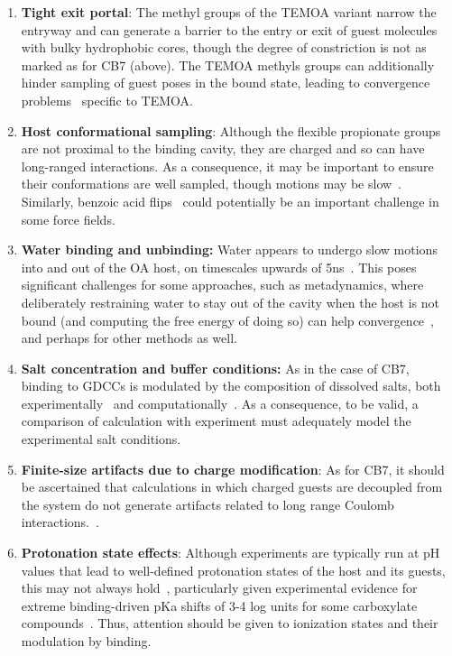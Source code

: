 \documentclass[aps,pre,twocolumn,nofootinbib,superscriptaddress,10pt, final,tightenlines]{revtex4-1}
\begin{document}
\begin{enumerate}
\item{{\bf Tight exit portal}: The methyl groups of the TEMOA variant narrow the entryway and can generate a barrier to the entry or exit of guest molecules with bulky hydrophobic cores, though the degree of constriction is not as marked as for CB7 (above). 
The TEMOA methyls groups can additionally hinder sampling of guest poses in the bound state, leading to convergence problems~\cite{yin_sampl5_preprint} specific to TEMOA. }

\item{{\bf Host conformational sampling}: Although the flexible propionate groups are not proximal to the binding cavity, they are charged and so can have long-ranged interactions. 
As a consequence, it may be important to ensure their conformations are well sampled, though motions may be slow~\cite{mikulskis_free-energy_2014}. 
Similarly, benzoic acid flips~\cite{yin_sampl5_2016, tofoleanu_absolute_2016} could potentially be an important challenge in some force fields.}

\item{{\bf Water binding and unbinding:} Water appears to undergo slow motions into and out of the OA host, on timescales upwards of 5ns~\cite{ewell_water_2008}. 
This poses significant challenges for some approaches, such as metadynamics, where deliberately restraining water to stay out of the cavity when the host is not bound (and computing the free energy of doing so) can help convergence~\cite{bhakat_resolving_2016}, and perhaps for other methods as well.}

\item{{\bf Salt concentration and buffer conditions:} As in the case of CB7, binding to GDCCs is modulated by the composition of dissolved salts, both experimentally~\cite{gibb_anion_2011, sokkalingam_binding_2016} and computationally~\cite{pal_combined_2016, tofoleanu_absolute_2016}. As a consequence, to be valid, a comparison of calculation with experiment must adequately model the experimental salt conditions.
}

\item{{\bf Finite-size artifacts due to charge modification}: As for CB7, it should be ascertained that calculations in which charged guests are decoupled from the system do not generate artifacts related to long range Coulomb interactions.~\cite{rocklin_calculating_2013, lin_overview_2014, reif_net_2014, simonson_concepts_2016}.}

\item{{\bf Protonation state effects}: Although experiments are typically run at pH values that lead to well-defined protonation states of the host and its guests, this may not always hold~\cite{muddana_sampl4_2014, ewell_water_2008, tofoleanu_absolute_2016}, particularly given experimental evidence for extreme binding-driven pKa shifts of 3-4 log units for some carboxylate compounds~\cite{wang_itc_2016, sokkalingam_binding_2016}. 
Thus, attention should be given to ionization states and their modulation by binding.}
\end{enumerate}
\end{document}
